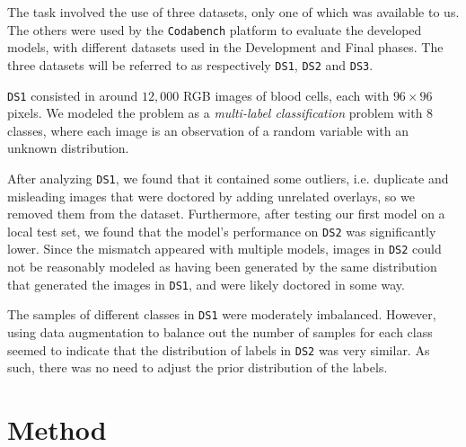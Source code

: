 \documentclass[11pt]{article}
\begin{document}
\begin{multicols}{2}

      The task involved the use of three datasets, only one of which was available to us. The others were used by the \texttt{Codabench}\cite{codabench} platform to evaluate the developed models, with different datasets used in the Development and Final phases. The three datasets will be referred to as respectively \texttt{DS1}, \texttt{DS2} and \texttt{DS3}.

      \texttt{DS1} consisted in around $12,000$ RGB images of blood cells, each with $96 \times 96$ pixels. We modeled the problem as a \textit{multi-label classification} problem with $8$ classes, where each image is an observation of a random variable with an unknown distribution.
      
      After analyzing \texttt{DS1}, we found that it contained some outliers, i.e. duplicate and misleading images that were doctored by adding unrelated overlays, so we removed them from the dataset. Furthermore, after testing our first model on a local test set, we found that the model's performance on \texttt{DS2} was significantly lower. Since the mismatch appeared with multiple models, images in \texttt{DS2} could not be reasonably modeled as having been generated by the same distribution that generated the images in \texttt{DS1}, and were likely doctored in some way.

      The samples of different classes in \texttt{DS1} were moderately imbalanced. However, using data augmentation to balance out the number of samples for each class seemed to indicate that the distribution of labels in \texttt{DS2} was very similar. As such, there was no need to adjust the prior distribution of the labels.

      \section{Method}


\end{multicols}
\end{document}
